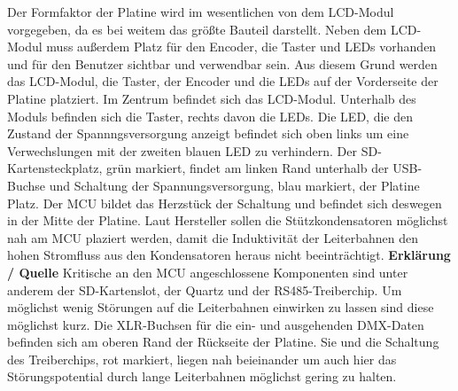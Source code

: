 Der Formfaktor der Platine wird im wesentlichen von dem LCD-Modul vorgegeben, da es bei weitem das größte Bauteil darstellt. Neben dem LCD-Modul muss außerdem Platz für den Encoder, die Taster und LEDs vorhanden und für den Benutzer sichtbar und verwendbar sein. Aus diesem Grund werden das LCD-Modul, die Taster, der Encoder und die LEDs auf der Vorderseite der Platine platziert. Im Zentrum befindet sich das LCD-Modul. Unterhalb des Moduls befinden sich die Taster, rechts davon die LEDs. Die LED, die den Zustand der Spannngsversorgung anzeigt befindet sich oben links um eine Verwechslungen mit der zweiten blauen LED zu verhindern. Der SD-Kartensteckplatz, grün markiert, findet am linken Rand unterhalb der USB-Buchse und Schaltung der Spannungsversorgung, blau markiert, der Platine Platz. Der MCU bildet das Herzstück der Schaltung und befindet sich deswegen  in der Mitte der Platine. Laut Hersteller sollen die Stützkondensatoren möglichst nah am MCU plaziert werden, damit die Induktivität der Leiterbahnen den hohen Stromfluss aus den Kondensatoren heraus nicht beeinträchtigt. \textbf{Erklärung / Quelle} Kritische an den MCU angeschlossene Komponenten sind unter anderem der SD-Kartenslot, der Quartz und der RS485-Treiberchip. Um möglichst wenig Störungen auf die Leiterbahnen einwirken zu lassen sind diese möglichst kurz. Die XLR-Buchsen für die ein- und ausgehenden DMX-Daten befinden sich am oberen Rand der Rückseite der Platine. Sie und die Schaltung des Treiberchips, rot markiert, liegen nah beieinander um auch hier das Störungspotential durch lange Leiterbahnen möglichst gering zu halten.